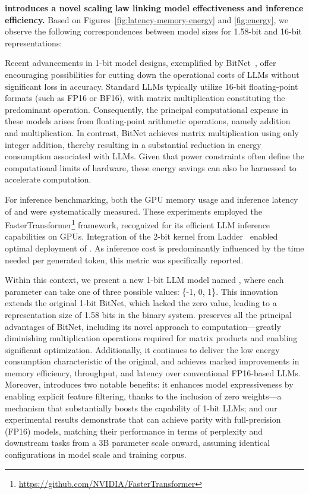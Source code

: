 \textbf{ introduces a novel scaling law linking model effectiveness and inference efficiency.} Based on Figures~\ref{fig:latency-memory-energy} and \ref{fig:energy}, we observe the following correspondences between model sizes for 1.58-bit and 16-bit representations:

Recent advancements in 1-bit model designs, exemplified by BitNet~\cite{bitnet}, offer encouraging possibilities for cutting down the operational costs of LLMs without significant loss in accuracy. Standard LLMs typically utilize 16-bit floating-point formats (such as FP16 or BF16), with matrix multiplication constituting the predominant operation. Consequently, the principal computational expense in these models arises from floating-point arithmetic operations, namely addition and multiplication. In contrast, BitNet achieves matrix multiplication using only integer addition, thereby resulting in a substantial reduction in energy consumption associated with LLMs. Given that power constraints often define the computational limits of hardware, these energy savings can also be harnessed to accelerate computation.

For inference benchmarking, both the GPU memory usage and inference latency of  and  were systematically measured. These experiments employed the FasterTransformer\footnote{\url{https://github.com/NVIDIA/FasterTransformer}} framework, recognized for its efficient LLM inference capabilities on GPUs. Integration of the 2-bit kernel from Ladder~\cite{ladder} enabled optimal deployment of . As inference cost is predominantly influenced by the time needed per generated token, this metric was specifically reported.

Within this context, we present a new 1-bit LLM model named \textbf{}, where each parameter can take one of three possible values: \{-1, 0, 1\}. This innovation extends the original 1-bit BitNet, which lacked the zero value, leading to a representation size of 1.58 bits in the binary system.  preserves all the principal advantages of BitNet, including its novel approach to computation—greatly diminishing multiplication operations required for matrix products and enabling significant optimization. Additionally, it continues to deliver the low energy consumption characteristic of the original, and achieves marked improvements in memory efficiency, throughput, and latency over conventional FP16-based LLMs. Moreover,  introduces two notable benefits: it enhances model expressiveness by enabling explicit feature filtering, thanks to the inclusion of zero weights—a mechanism that substantially boosts the capability of 1-bit LLMs; and our experimental results demonstrate that  can achieve parity with full-precision (FP16) models, matching their performance in terms of perplexity and downstream tasks from a 3B parameter scale onward, assuming identical configurations in model scale and training corpus.

